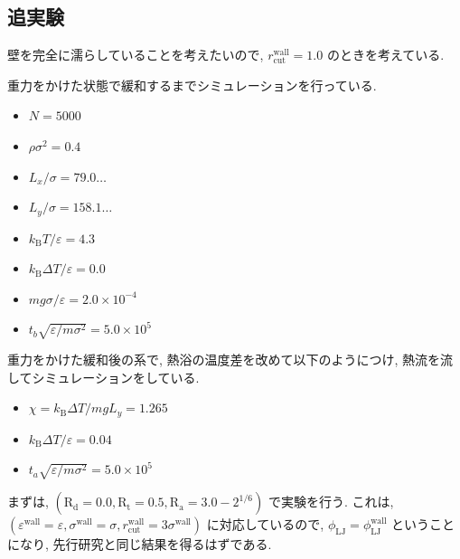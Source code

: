 \subsection{追実験}

壁を完全に濡らしていることを考えたいので, $r^{\text{wall}}_{\text{cut}}=1.0$ のときを考えている.

重力をかけた状態で緩和するまでシミュレーションを行っている.

\begin{itemize}
  \item $N = 5000$
  \item $\rho \sigma^2 = 0.4$
  \item $L_x / \sigma = 79.0\dots$
  \item $L_y / \sigma = 158.1\dots$
  \item $k_{\text{B}} T/\varepsilon = 4.3$
  \item $k_{\text{B}} \Delta T/\varepsilon = 0.0$
  \item $mg\sigma/\varepsilon = 2.0 \times 10^{-4}$
  \item $t_b \sqrt{\varepsilon / m \sigma^2} = 5.0 \times 10^{5}$
\end{itemize}

重力をかけた緩和後の系で, 熱浴の温度差を改めて以下のようにつけ, 熱流を流してシミュレーションをしている.

\begin{itemize}
  \item $\chi = k_{\text{B}}\Delta T / mg L_y = 1.265$
  \item $k_{\text{B}} \Delta T/\varepsilon = 0.04$
  \item $t_a \sqrt{\varepsilon / m \sigma^2} = 5.0 \times 10^{5}$
\end{itemize}

まずは, $(\text{R}_\text{d} = 0.0, \text{R}_\text{t} = 0.5, \text{R}_\text{a} = 3.0 - 2^{1/6})$ で実験を行う. これは, $(\varepsilon^{\text{wall}} = \varepsilon, \sigma^{\text{wall}} = \sigma, r^{\text{wall}}_{\text{cut}} = 3\sigma^{\text{wall}})$ に対応しているので, $\phi_{\text{LJ}} = \phi_{\text{LJ}}^{\text{wall}}$ ということになり, 先行研究と同じ結果を得るはずである.

